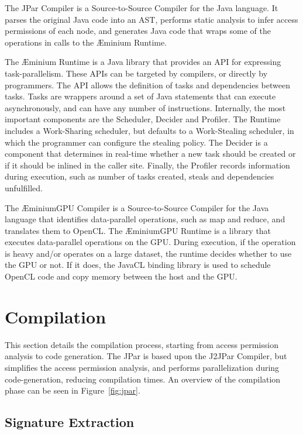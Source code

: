 \documentclass[smallextended]{svjour3}
\begin{document}
The JPar Compiler is a Source-to-Source Compiler for the Java language. It parses the original Java code into an AST, performs static analysis to infer access permissions of each node, and generates Java code that wraps some of the operations in calls to the Æminium Runtime.

The Æminium Runtime is a Java library that provides an API for expressing task-parallelism. These APIs can be targeted by compilers, or directly by programmers. The API allows the definition of tasks and dependencies between tasks. Tasks are wrappers around a set of Java statements that can execute asynchronously, and can have any number of instructions. Internally, the most important components are the Scheduler, Decider and Profiler. The Runtime includes a Work-Sharing scheduler, but defaults to a Work-Stealing scheduler, in which the programmer can configure the stealing policy. The Decider is a component that determines in real-time whether a new task should be created or if it should be inlined in the caller site. Finally, the Profiler records information during execution, such as number of tasks created, steals and dependencies unfulfilled.

The ÆminiumGPU Compiler is a Source-to-Source Compiler for the Java language that identifies data-parallel operations, such as map and reduce, and translates them to OpenCL. The ÆminiumGPU Runtime is a library that executes data-parallel operations on the GPU. During execution, if the operation is heavy and/or operates on a large dataset, the runtime decides whether to use the GPU or not. If it does, the JavaCL binding library\cite{dominguez2013evaluating} is used to schedule OpenCL code and copy memory between the host and the GPU.


\section{Compilation}
\label{sec:compilation}

This section details the compilation process, starting from access permission analysis to code generation. The JPar is based upon the J2JPar Compiler\cite{rafael2014dependency}, but simplifies the access permission analysis, and performs parallelization during code-generation, reducing compilation times. An overview of the compilation phase can be seen in Figure~\ref{fig:jpar}.


\subsection{Signature Extraction}
\end{document}
